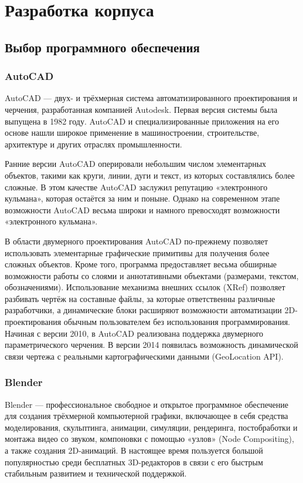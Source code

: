 \section{Разработка корпуса}
\label{sec:case}

\subsection{Выбор программного обеспечения}
\subsubsection{AutoCAD}
AutoCAD — двух- и трёхмерная система автоматизированного проектирования и черчения, разработанная компанией Autodesk. Первая версия системы была выпущена в 1982 году. AutoCAD и специализированные приложения на его основе нашли широкое применение в машиностроении, строительстве, архитектуре и других отраслях промышленности.


Ранние версии AutoCAD оперировали небольшим числом элементарных объектов, такими как круги, линии, дуги и текст, из которых составлялись более сложные. В этом качестве AutoCAD заслужил репутацию «электронного кульмана», которая остаётся за ним и поныне. Однако на современном этапе возможности AutoCAD весьма широки и намного превосходят возможности «электронного кульмана».


В области двумерного проектирования AutoCAD по-прежнему позволяет использовать элементарные графические примитивы для получения более сложных объектов. Кроме того, программа предоставляет весьма обширные возможности работы со слоями и аннотативными объектами (размерами, текстом, обозначениями). Использование механизма внешних ссылок (XRef) позволяет разбивать чертёж на составные файлы, за которые ответственны различные разработчики, а динамические блоки расширяют возможности автоматизации 2D-проектирования обычным пользователем без использования программирования. Начиная с версии 2010, в AutoCAD реализована поддержка двумерного параметрического черчения. В версии 2014 появилась возможность динамической связи чертежа с реальными картографическими данными (GeoLocation API).

\subsubsection{Blender}

Blender — профессиональное свободное и открытое программное обеспечение для создания трёхмерной компьютерной графики, включающее в себя средства моделирования, скульптинга, анимации, симуляции, рендеринга, постобработки и монтажа видео со звуком, компоновки с помощью «узлов» (Node Compositing), а также создания 2D-анимаций. В настоящее время пользуется большой популярностью среди бесплатных 3D-редакторов в связи с его быстрым стабильным развитием и технической поддержкой.


